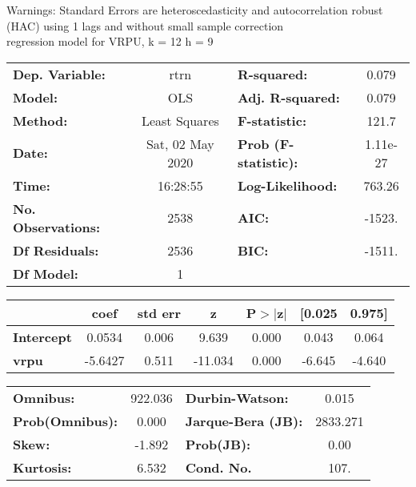 Warnings: \newline
 [1] Standard Errors are heteroscedasticity and autocorrelation robust (HAC) using 1 lags and without small sample correction\\ 

regression model for VRPU, k = 12 h = 9\begin{center}
\begin{tabular}{lclc}
\toprule
\textbf{Dep. Variable:}    &       rtrn       & \textbf{  R-squared:         } &     0.079   \\
\textbf{Model:}            &       OLS        & \textbf{  Adj. R-squared:    } &     0.079   \\
\textbf{Method:}           &  Least Squares   & \textbf{  F-statistic:       } &     121.7   \\
\textbf{Date:}             & Sat, 02 May 2020 & \textbf{  Prob (F-statistic):} &  1.11e-27   \\
\textbf{Time:}             &     16:28:55     & \textbf{  Log-Likelihood:    } &    763.26   \\
\textbf{No. Observations:} &        2538      & \textbf{  AIC:               } &    -1523.   \\
\textbf{Df Residuals:}     &        2536      & \textbf{  BIC:               } &    -1511.   \\
\textbf{Df Model:}         &           1      & \textbf{                     } &             \\
\bottomrule
\end{tabular}
\begin{tabular}{lcccccc}
                   & \textbf{coef} & \textbf{std err} & \textbf{z} & \textbf{P$> |$z$|$} & \textbf{[0.025} & \textbf{0.975]}  \\
\midrule
\textbf{Intercept} &       0.0534  &        0.006     &     9.639  &         0.000        &        0.043    &        0.064     \\
\textbf{vrpu}      &      -5.6427  &        0.511     &   -11.034  &         0.000        &       -6.645    &       -4.640     \\
\bottomrule
\end{tabular}
\begin{tabular}{lclc}
\textbf{Omnibus:}       & 922.036 & \textbf{  Durbin-Watson:     } &    0.015  \\
\textbf{Prob(Omnibus):} &   0.000 & \textbf{  Jarque-Bera (JB):  } & 2833.271  \\
\textbf{Skew:}          &  -1.892 & \textbf{  Prob(JB):          } &     0.00  \\
\textbf{Kurtosis:}      &   6.532 & \textbf{  Cond. No.          } &     107.  \\
\bottomrule
\end{tabular}
\end{center}

